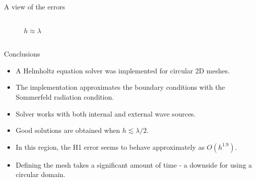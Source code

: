 \documentclass{beamer}
\begin{document}
\begin{frame}{A view of the errors}
\begin{columns}
\begin{column}{0.5\textwidth}
\begin{center}
\begin{figure}
    \caption{$h \approx \lambda$}
    \end{figure}
    \end{center}
  \end{column}
  \end{columns}
\end{frame}

\begin{frame}{Conclusions}
 \begin{itemize}
  \item A Helmholtz equation solver was implemented for circular 2D meshes.
  \item The implementation approximates the boundary conditions with the Sommerfeld radiation condition.
  \item Solver works with both internal and external wave sources.
  \item Good solutions are obtained when $h \lesssim \lambda/2$.
  \item In this region, the H1 error seems to behave approximately as $O( h^{1.9})$.
  \item Defining the mesh takes a significant amount of time - a downside for using a circular domain.
 \end{itemize}

\end{frame}
\end{document}

